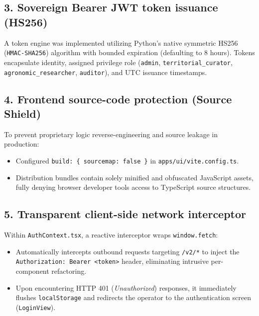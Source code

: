 \documentclass[11pt,a4paper]{article}
\begin{document}
\subsection{3. Sovereign Bearer JWT token issuance (HS256)}
A token engine was implemented utilizing Python's native symmetric HS256 (\texttt{HMAC-SHA256}) algorithm with bounded expiration (defaulting to 8 hours). Tokens encapsulate identity, assigned privilege role (\texttt{admin}, \texttt{territorial\_curator}, \texttt{agronomic\_researcher}, \texttt{auditor}), and UTC issuance timestamps.

\subsection{4. Frontend source-code protection (Source Shield)}
To prevent proprietary logic reverse-engineering and source leakage in production:
\begin{itemize}[leftmargin=*]
    \item Configured \texttt{build: \{ sourcemap: false \}} in \texttt{apps/ui/vite.config.ts}.
    \item Distribution bundles contain solely minified and obfuscated JavaScript assets, fully denying browser developer tools access to TypeScript source structures.
\end{itemize}

\subsection{5. Transparent client-side network interceptor}
Within \texttt{AuthContext.tsx}, a reactive interceptor wraps \texttt{window.fetch}:
\begin{itemize}[leftmargin=*]
    \item Automatically intercepts outbound requests targeting \texttt{/v2/*} to inject the \texttt{Authorization: Bearer <token>} header, eliminating intrusive per-component refactoring.
    \item Upon encountering HTTP 401 (\textit{Unauthorized}) responses, it immediately flushes \texttt{localStorage} and redirects the operator to the authentication screen (\texttt{LoginView}).
\end{itemize}
\end{document}
